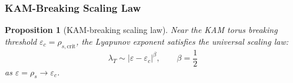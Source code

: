 \documentclass[
]{article}
\newtheorem{proposition}[theorem]{Proposition}
\begin{document}
\subsubsection{KAM-Breaking Scaling Law}\label{subsec:kam-scaling}

\begin{proposition}[KAM-breaking scaling law]\label{prop:kam-scaling}
Near the KAM torus breaking threshold $\varepsilon_c = \rho_{s,\text{crit}}$, the Lyapunov exponent satisfies the universal scaling law:
\begin{equation}\label{eq:kam-scaling}
\lambda_T \sim |\varepsilon - \varepsilon_c|^\beta, \qquad \beta = \frac{1}{2}
\end{equation}
as $\varepsilon = \rho_s \to \varepsilon_c$.
\end{proposition}
\end{document}
